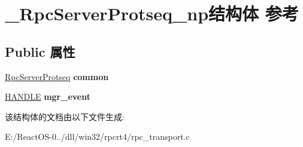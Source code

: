 \hypertarget{struct___rpc_server_protseq__np}{}\section{\+\_\+\+Rpc\+Server\+Protseq\+\_\+np结构体 参考}
\label{struct___rpc_server_protseq__np}
\subsection*{Public 属性}
\begin{DoxyCompactItemize}
\item 
\mbox{\label{struct___rpc_server_protseq__np_a48c1ca4947bcc5964a242faf9e50fa6f}} 
\hyperlink{struct___rpc_server_protseq}{Rpc\+Server\+Protseq} {\bfseries common}
\item 
\mbox{\label{struct___rpc_server_protseq__np_ab6f416d88772553c16ec42b35f683e47}} 
\hyperlink{interfacevoid}{H\+A\+N\+D\+LE} {\bfseries mgr\+\_\+event}
\end{DoxyCompactItemize}


该结构体的文档由以下文件生成\+:\begin{DoxyCompactItemize}
\item 
E\+:/\+React\+O\+S-\/0../dll/win32/rpcrt4/rpc\+\_\+transport.\+c\end{DoxyCompactItemize}
